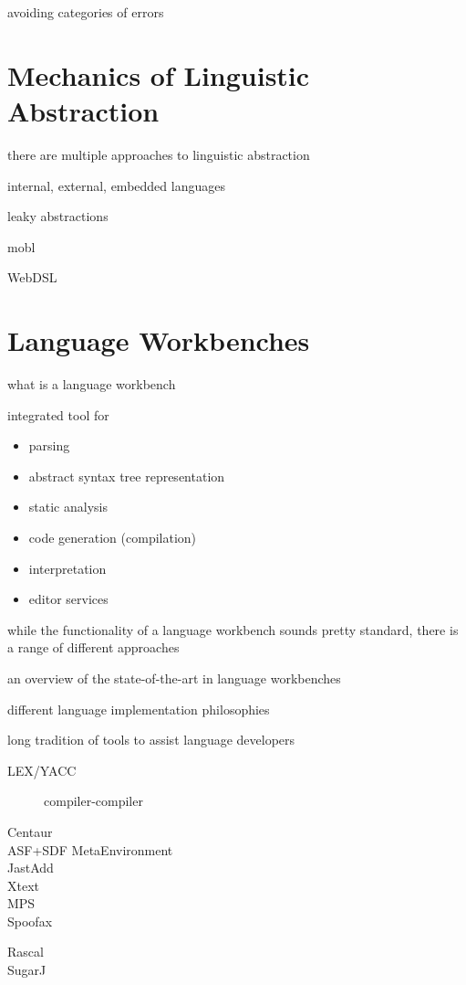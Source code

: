 avoiding categories of errors


\section{Mechanics of Linguistic Abstraction}

there are multiple approaches to linguistic abstraction

internal, external, embedded languages

leaky abstractions

mobl \cite{HemelV11}

WebDSL \cite{HemelGKV11}


\section{Language Workbenches}

what is a language workbench

integrated tool for 

\begin{itemize}
  \item parsing
  \item abstract syntax tree representation
  \item static analysis
  \item code generation (compilation)
  \item interpretation
  \item editor services
\end{itemize}

while the functionality of a language workbench sounds pretty standard, there is
a range of different approaches 

an overview of the state-of-the-art in language workbenches \cite{ErdwegSV13}

different language implementation philosophies

long tradition of tools to assist language developers

\begin{description}
\item[LEX/YACC] compiler-compiler
\item[Centaur]
\item[ASF+SDF MetaEnvironment]
\item[JastAdd]
\item[Xtext]
\item[MPS]
\item[Spoofax] \cite{KatsV10}
\item[Rascal]
\item[SugarJ] 
\end{description}


